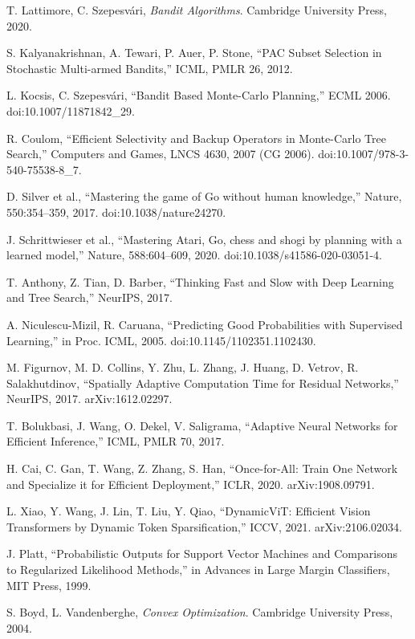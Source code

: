 \begin{thebibliography}{99}
T. Lattimore, C. Szepesvári, \emph{Bandit Algorithms}. Cambridge University Press, 2020.

S. Kalyanakrishnan, A. Tewari, P. Auer, P. Stone, ``PAC Subset Selection in Stochastic Multi-armed Bandits,'' ICML, PMLR 26, 2012.

L. Kocsis, C. Szepesvári, ``Bandit Based Monte-Carlo Planning,'' ECML 2006. doi:10.1007/11871842\_29.

R. Coulom, ``Efficient Selectivity and Backup Operators in Monte-Carlo Tree Search,'' Computers and Games, LNCS 4630, 2007 (CG 2006). doi:10.1007/978-3-540-75538-8\_7.

D. Silver et al., ``Mastering the game of Go without human knowledge,'' Nature, 550:354--359, 2017. doi:10.1038/nature24270.

J. Schrittwieser et al., ``Mastering Atari, Go, chess and shogi by planning with a learned model,'' Nature, 588:604--609, 2020. doi:10.1038/s41586-020-03051-4.

T. Anthony, Z. Tian, D. Barber, ``Thinking Fast and Slow with Deep Learning and Tree Search,'' NeurIPS, 2017.

A. Niculescu-Mizil, R. Caruana, ``Predicting Good Probabilities with Supervised Learning,'' in Proc. ICML, 2005. doi:10.1145/1102351.1102430.

M. Figurnov, M. D. Collins, Y. Zhu, L. Zhang, J. Huang, D. Vetrov, R. Salakhutdinov, ``Spatially Adaptive Computation Time for Residual Networks,'' NeurIPS, 2017. arXiv:1612.02297.

T. Bolukbasi, J. Wang, O. Dekel, V. Saligrama, ``Adaptive Neural Networks for Efficient Inference,'' ICML, PMLR 70, 2017.

H. Cai, C. Gan, T. Wang, Z. Zhang, S. Han, ``Once-for-All: Train One Network and Specialize it for Efficient Deployment,'' ICLR, 2020. arXiv:1908.09791.

L. Xiao, Y. Wang, J. Lin, T. Liu, Y. Qiao, ``DynamicViT: Efficient Vision Transformers by Dynamic Token Sparsification,'' ICCV, 2021. arXiv:2106.02034.

J. Platt, ``Probabilistic Outputs for Support Vector Machines and Comparisons to Regularized Likelihood Methods,'' in Advances in Large Margin Classifiers, MIT Press, 1999.

S. Boyd, L. Vandenberghe, \emph{Convex Optimization}. Cambridge University Press, 2004.

\end{thebibliography}

